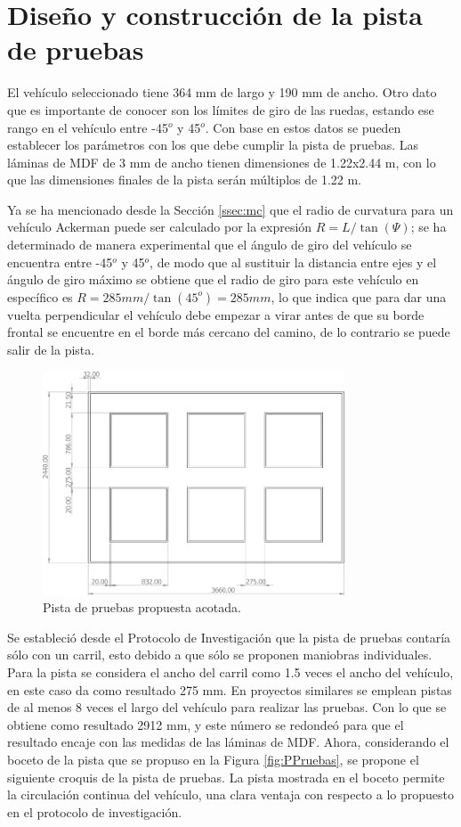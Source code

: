 \section{Diseño y construcción de la pista de pruebas}
\label{sec:platpru}
El vehículo seleccionado tiene 364 mm de largo y 190 mm de ancho. Otro dato que es importante de conocer son los límites de giro de las ruedas, estando ese rango en el vehículo entre -45$^o$ y 45$^o$. Con base en estos datos se pueden establecer los parámetros con los que debe cumplir la pista de pruebas. Las láminas de MDF de 3 mm de ancho tienen dimensiones de 1.22x2.44 m, con lo que las dimensiones finales de la pista serán múltiplos de 1.22 m.
\par Ya se ha mencionado desde la Sección \ref{ssec:mc} que el radio de curvatura para un vehículo Ackerman puede ser calculado por la expresión $R=L/\tan(\varPsi)$; se ha determinado de manera experimental que el ángulo de giro del vehículo se encuentra entre -45$^{o}$ y 45$^{o}$, de modo que al sustituir la distancia entre ejes y el ángulo de giro máximo se obtiene que el radio de giro para este vehículo en específico es $R=285mm/\tan(45^o)=285mm$, lo que indica que para dar una vuelta perpendicular el vehículo debe empezar a virar antes de que su borde frontal se encuentre en el borde más cercano del camino, de lo contrario se puede salir de la pista.
\begin{figure}[htbp!]
	\centering
	\includegraphics[width=0.8\textwidth]{./Figuras/Pista}
	\caption{Pista de pruebas propuesta acotada.}
	\label{fig:Pista}
\end{figure}
\par Se estableció desde el Protocolo de Investigación que la pista de pruebas contaría sólo con un carril, esto debido a que sólo se proponen maniobras individuales. Para la pista se considera el ancho del carril como 1.5 veces el ancho del vehículo, en este caso da como resultado 275 mm. En proyectos similares se emplean pistas de al menos 8 veces el largo del vehículo para realizar las pruebas. Con lo que se obtiene como resultado 2912 mm, y este número se redondeó para que el resultado encaje con las medidas de las láminas de MDF. Ahora, considerando el boceto de la pista que se propuso en la Figura \ref{fig:PPruebas}, se propone el siguiente croquis de la pista de pruebas. La pista mostrada en el boceto permite la circulación continua del vehículo, una clara ventaja con respecto a lo propuesto en el protocolo de investigación.
